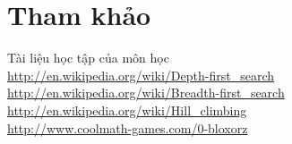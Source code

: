 \documentclass[a4paper]{article}
\begin{document}
\section{Tham khảo}
\begin{flushleft}
	\hspace{2 cm} \textbullet \hspace{0.5 cm} Tài liệu học tập của môn học \\
	\hspace{2 cm} \textbullet \hspace{0.5 cm} \url{http://en.wikipedia.org/wiki/Depth-first\_search} \\
	\hspace{2 cm} \textbullet \hspace{0.5 cm} \url{http://en.wikipedia.org/wiki/Breadth-first\_search} \\
	\hspace{2 cm} \textbullet \hspace{0.5 cm} \url{http://en.wikipedia.org/wiki/Hill\_climbing} \\
	\hspace{2 cm} \textbullet \hspace{0.5 cm} \url{http://www.coolmath-games.com/0-bloxorz} \\
\end{flushleft}
\end{document}
